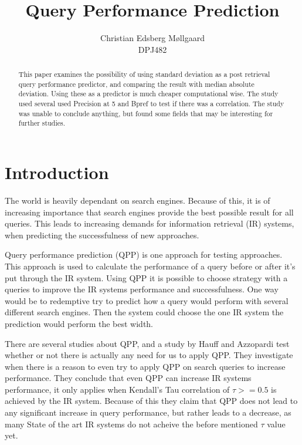 \documentclass{sig-alternate}
\begin{document}
\title{Query Performance Prediction}
\author{
\alignauthor 
Christian Edsberg Møllgaard \\ DPJ482
}
\maketitle

\begin{abstract}
This paper examines the possibility of using standard deviation as a post retrieval query performance predictor, and comparing the result with median absolute deviation. Using these as a predictor is much cheaper computational wise. The study used several used Precision at 5 and Bpref to test if there was a correlation. The study was unable to conclude anything, but found some fields that may be interesting for further studies.

\end{abstract}

\section{Introduction}
The world is heavily dependant on search engines. Because of this, it is of increasing importance that search engines provide the best possible result for all queries. This leads to increasing demands for information retrieval (IR) systems, when predicting the successfulness of new approaches.

Query performance prediction (QPP) is one approach for testing approaches. This approach is used to calculate the performance of a query before or after it's put through the IR system. Using QPP it is possible to choose strategy with a queries to improve the IR systems performance and successfulness. One way would be to redemptive try to predict how a query would perform with several different search engines. Then the system could choose the one IR system the prediction would perform the best width.

There are several studies about QPP, and a study by Hauff and Azzopardi\cite{review1} test whether or not there is actually any need for us to apply QPP. They investigate when there is a reason to even try to apply QPP on search queries to increase performance. They conclude that even QPP can increase IR systems performance, it only applies when Kendall's Tau correlation of $\tau >= 0.5$ is achieved by the IR system. Because of this they claim that QPP does not lead to any significant increase in query performance, but rather leads to a decrease, as many State of the art IR systems do not acheive the before mentioned $\tau$ value yet. 
\end{document}
